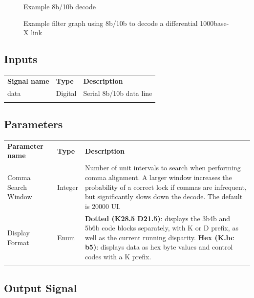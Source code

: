\begin{figure}[h]
\centering
{}
\caption{Example 8b/10b decode}
\label{filter_8b10b}
\end{figure}

\begin{figure}[h]
\centering
{}
\caption{Example filter graph using 8b/10b to decode a differential 1000base-X link}
\label{filter_graph_8b10b}
\end{figure}

\subsection{Inputs}

\begin{tabularx}{16cm}{llX}
\thickhline
\textbf{Signal name} & \textbf{Type} & \textbf{Description} \\
\thickhline
data & Digital & Serial 8b/10b data line \\
\thickhline
\end{tabularx}

\subsection{Parameters}

\begin{tabularx}{16cm}{llX}
\thickhline
\textbf{Parameter name} & \textbf{Type} & \textbf{Description} \\
\thinhline
Comma Search Window & Integer &
Number of unit intervals to search when performing comma alignment. A larger window increases the probability of a
correct lock if commas are infrequent, but significantly slows down the decode. The default is 20000 UI. \\
\thinhline
Display Format & Enum &
	\textbf{Dotted (K28.5 D21.5)}: displays the 3b4b and 5b6b code blocks separately, with K or D prefix, as well as the current running disparity. \newline
	\textbf{Hex (K.bc b5)}: displays data as hex byte values and control codes with a K prefix. \\
\thickhline
\end{tabularx}

\subsection{Output Signal}

